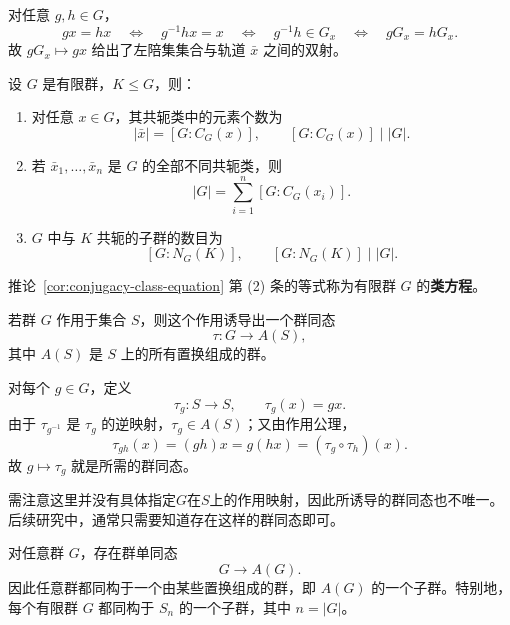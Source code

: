 \begin{purpleproof}
对任意 $g,h\in G$，
\[
  gx=hx
  \quad\Longleftrightarrow\quad g^{-1}hx=x
  \quad\Longleftrightarrow\quad g^{-1}h\in G_x
  \quad\Longleftrightarrow\quad gG_x=hG_x.
\]
故 $gG_x\mapsto gx$ 给出了左陪集集合与轨道 $\bar x$ 之间的双射。
\end{purpleproof}

\begin{corollary}\label{cor:conjugacy-class-equation}
设 $G$ 是有限群，$K\leq G$，则：
\begin{enumerate}[label=(\arabic*)]
  \item 对任意 $x\in G$，其共轭类中的元素个数为
  \[
    |\bar x|=[G:C_G(x)],\qquad [G:C_G(x)]\mid |G|.
  \]
  \item 若 $\bar x_1,\ldots,\bar x_n$ 是 $G$ 的全部不同共轭类，则
  \[
    |G|=\sum_{i=1}^{n}[G:C_G(x_i)].
  \]
  \item $G$ 中与 $K$ 共轭的子群的数目为
  \[
    [G:N_G(K)],\qquad [G:N_G(K)]\mid |G|.
  \]
\end{enumerate}
\end{corollary}

\begin{purplenote}
推论~\ref{cor:conjugacy-class-equation} 第 (2) 条的等式称为有限群 $G$ 的\textbf{类方程}。
\end{purplenote}

\begin{theorem}\label{thm:action-induced-permutation-homomorphism}
若群 $G$ 作用于集合 $S$，则这个作用诱导出一个群同态
\[
  \tau:G\longrightarrow A(S),
\]
其中 $A(S)$ 是 $S$ 上的所有置换组成的群。
\end{theorem}

\begin{purpleproof}
对每个 $g\in G$，定义
\[
  \tau_g:S\longrightarrow S,\qquad \tau_g(x)=gx.
\]
由于 $\tau_{g^{-1}}$ 是 $\tau_g$ 的逆映射，$\tau_g\in A(S)$；又由作用公理，
\[
  \tau_{gh}(x)=(gh)x=g(hx)=(\tau_g\circ\tau_h)(x).
\]
故 $g\mapsto\tau_g$ 就是所需的群同态。
\end{purpleproof}

\begin{purplenote}
需注意这里并没有具体指定$G$在$S$上的作用映射，因此所诱导的群同态也不唯一。后续研究中，通常只需要知道存在这样的群同态即可。
\end{purplenote}

\begin{corollary}[Cayley]\label{cor:cayley-permutation-embedding}
对任意群 $G$，存在群单同态
\[
  G\longrightarrow A(G).
\]
因此任意群都同构于一个由某些置换组成的群，即 $A(G)$ 的一个子群。特别地，每个有限群 $G$ 都同构于 $S_n$ 的一个子群，其中 $n=|G|$。
\end{corollary}

